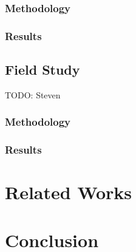 \documentclass{article}
\begin{document}
\subsubsection{Methodology}
\subsubsection{Results}

\subsection{Field Study}
TODO: Steven
\subsubsection{Methodology}
\subsubsection{Results}

\section{Related Works}
\section{Conclusion}
\end{document}

